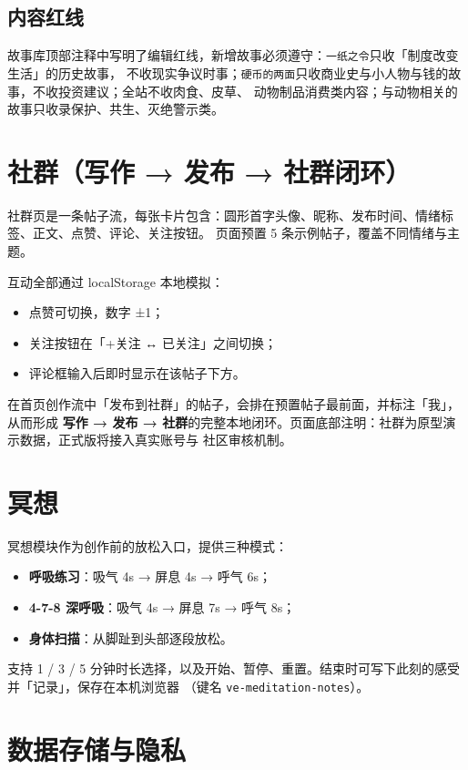 \documentclass[12pt,a4paper]{ctexart}
\begin{document}
\subsection{内容红线}

故事库顶部注释中写明了编辑红线，新增故事必须遵守：\texttt{一纸之令}只收「制度改变生活」的历史故事，
不收现实争议时事；\texttt{硬币的两面}只收商业史与小人物与钱的故事，不收投资建议；全站不收肉食、皮草、
动物制品消费类内容；与动物相关的故事只收录保护、共生、灭绝警示类。

\section{社群（写作 → 发布 → 社群闭环）}

社群页是一条帖子流，每张卡片包含：圆形首字头像、昵称、发布时间、情绪标签、正文、点赞、评论、关注按钮。
页面预置 5 条示例帖子，覆盖不同情绪与主题。

互动全部通过 localStorage 本地模拟：

\begin{itemize}
  \item 点赞可切换，数字 ±1；
  \item 关注按钮在「+关注 ↔ 已关注」之间切换；
  \item 评论框输入后即时显示在该帖子下方。
\end{itemize}

在首页创作流中「发布到社群」的帖子，会排在预置帖子最前面，并标注「我」，从而形成
\textbf{写作 → 发布 → 社群}的完整本地闭环。页面底部注明：社群为原型演示数据，正式版将接入真实账号与
社区审核机制。

\section{冥想}

冥想模块作为创作前的放松入口，提供三种模式：

\begin{itemize}
  \item \textbf{呼吸练习}：吸气 4s → 屏息 4s → 呼气 6s；
  \item \textbf{4-7-8 深呼吸}：吸气 4s → 屏息 7s → 呼气 8s；
  \item \textbf{身体扫描}：从脚趾到头部逐段放松。
\end{itemize}

支持 1 / 3 / 5 分钟时长选择，以及开始、暂停、重置。结束时可写下此刻的感受并「记录」，保存在本机浏览器
（键名 \texttt{ve-meditation-notes}）。

\section{数据存储与隐私}
\end{document}
